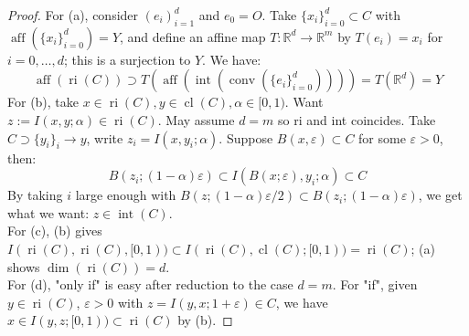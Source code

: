\begin{proof}
	For (a), consider $(e_i)_{i=1}^d$ and $e_0=O$. Take $\{x_i\}_{i=0}^d\subset C$ with $\operatorname{aff}(\{x_i\}_{i=0}^d)=Y$, and define an affine map $T:\mathbb{R}^d\to \mathbb{R}^m$ by $T(e_i)=x_i$ for $i=0,\dotsc,d$; this is a surjection to $Y$. We have:
	\[
		\operatorname{aff}(\operatorname{ri}(C)) \supset T\left(\operatorname{aff}\left(\operatorname{int}\left(\operatorname{conv}\left(\{e_i\}_{i=0}^d\right)\right)\right)\right)=T(\mathbb{R}^d)=Y
	\]
	For (b), take $x\in \operatorname{ri}(C),y\in \operatorname{cl}(C), \alpha \in[0, 1)$. Want $z:=I(x, y; \alpha )\in\operatorname{ri}(C)$. May assume $d=m$ so ri and int coincides. Take $C\supset\{y_i\}_i\to y$, write $z_i=I(x,y_i;\alpha )$. Suppose $B(x,\varepsilon )\subset C$ for some $\varepsilon >0$, then:
	\[
		B(z_i;(1-\alpha )\varepsilon )\subset I(B(x;\varepsilon ),y_i;\alpha)\subset C
	\]
	By taking $i$ large enough with $B(z;(1-\alpha )\varepsilon /2)\subset B(z_i;(1-\alpha )\varepsilon )$, we get what we want: $z\in \operatorname{int}(C)$.\\
	For (c), (b) gives $I(\operatorname{ri}(C),\operatorname{ri}(C),[0, 1))\subset I(\operatorname{ri}(C),\operatorname{cl}(C);[0,1))=\operatorname{ri}(C)$; (a) shows $\operatorname{dim}(\operatorname{ri}(C))=d$.\\
	For (d), "only if" is easy after reduction to the case $d=m$. For "if", given $y\in \operatorname{ri}(C)$, $\varepsilon>0$ with $z=I(y,x;1+\varepsilon )\in C$, we have $x\in I(y,z;[0,1))\subset \operatorname{ri}(C)$ by (b).
\end{proof}

